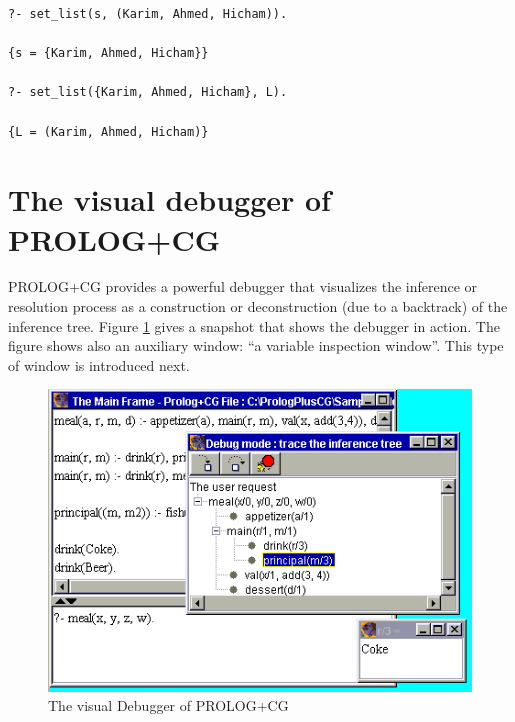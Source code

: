 \documentclass{book}
\begin{document}
\begin{verbatim}
?- set_list(s, (Karim, Ahmed, Hicham)).

{s = {Karim, Ahmed, Hicham}}

?- set_list({Karim, Ahmed, Hicham}, L).

{L = (Karim, Ahmed, Hicham)}
\end{verbatim}


\section{The visual debugger of PROLOG+CG}\label{Sec:Debugger}

PROLOG+CG provides a powerful debugger that visualizes the inference
or resolution process as a construction or deconstruction (due to a
backtrack) of the inference tree. Figure \ref{Debug} gives a snapshot
that shows the debugger in action.  The figure shows also an auxiliary
window: ``a variable inspection window''. This type of window is
introduced next.


\begin{latexonly}

\begin{figure}
\begin{center}
\includegraphics[scale=0.6]{Debug.png}
\end{center}
\caption{\label{Debug}The visual Debugger of PROLOG+CG}
\end{figure}

\end{latexonly}
\end{document}
